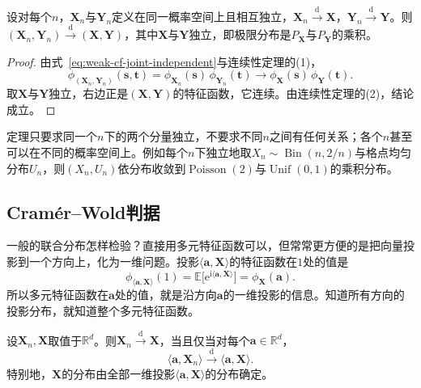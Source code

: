 \begin{theorem}[独立分量的联合极限]
\label{thm:weak-independent-joint}
设对每个$n$，$\bm{X}_n$与$\bm{Y}_n$定义在同一概率空间上且相互独立，$\bm{X}_n\xrightarrow{\mathrm{d}}\bm{X}$，$\bm{Y}_n\xrightarrow{\mathrm{d}}\bm{Y}$。则$(\bm{X}_n,\bm{Y}_n)\xrightarrow{\mathrm{d}}(\bm{X},\bm{Y})$，其中$\bm{X}$与$\bm{Y}$独立，即极限分布是$P_{\bm{X}}$与$P_{\bm{Y}}$的乘积。
\end{theorem}

\begin{proof}
由式~\eqref{eq:weak-cf-joint-independent}与连续性定理的(1)，
\[
 \phi_{(\bm{X}_n,\bm{Y}_n)}(\bm{s},\bm{t})=\phi_{\bm{X}_n}(\bm{s})\,\phi_{\bm{Y}_n}(\bm{t})\longrightarrow\phi_{\bm{X}}(\bm{s})\,\phi_{\bm{Y}}(\bm{t}) .
\]
取$\bm{X}$与$\bm{Y}$独立，右边正是$(\bm{X},\bm{Y})$的特征函数，它连续。由连续性定理的(2)，结论成立。
\end{proof}

定理只要求同一个$n$下的两个分量独立，不要求不同$n$之间有任何关系；各个$n$甚至可以在不同的概率空间上。例如每个$n$下独立地取$X_n\sim\operatorname{Bin}(n,2/n)$与格点均匀分布$U_n$，则$(X_n,U_n)$依分布收敛到$\operatorname{Poisson}(2)$与$\operatorname{Unif}(0,1)$的乘积分布。

\subsection{Cramér--Wold判据}
\label{sec:weak-cramer-wold}

一般的联合分布怎样检验？直接用多元特征函数可以，但常常更方便的是把向量投影到一个方向上，化为一维问题。投影$\langle\bm{a},\bm{X}\rangle$的特征函数在$1$处的值是
\[
 \phi_{\langle\bm{a},\bm{X}\rangle}(1)=\mathbb{E}\bigl[\mathrm{e}^{\mathrm{i}\langle\bm{a},\bm{X}\rangle}\bigr]=\phi_{\bm{X}}(\bm{a}) .
\]
所以多元特征函数在$\bm{a}$处的值，就是沿方向$\bm{a}$的一维投影的信息。知道所有方向的投影分布，就知道整个多元特征函数。

\begin{theorem}
\label{thm:weak-cramer-wold}
设$\bm{X}_n,\bm{X}$取值于$\mathbb{R}^{d}$。则$\bm{X}_n\xrightarrow{\mathrm{d}}\bm{X}$，当且仅当对每个$\bm{a}\in\mathbb{R}^{d}$，
\begin{equation}
 \langle\bm{a},\bm{X}_n\rangle\xrightarrow{\mathrm{d}}\langle\bm{a},\bm{X}\rangle .
 \label{eq:weak-cramer-wold}
\end{equation}
特别地，$\bm{X}$的分布由全部一维投影$\langle\bm{a},\bm{X}\rangle$的分布确定。
\end{theorem}

